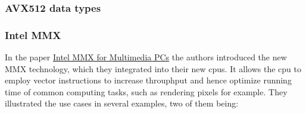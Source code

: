\documentclass[../../main.tex]{subfiles}
\begin{document}
\newpage
\subsubsection{AVX512 data types}

\bigskip
\subsubsection{Intel MMX}
In the paper \href{https://dl.acm.org/doi/pdf/10.1145/242857.242865}{Intel MMX for Multimedia PCs} the authors introduced the new MMX technology, which they integrated into their new cpus. It allows the cpu to employ vector instructions to increase throuphput and hence optimize running time of common computing tasks, such as rendering pixels for example. They illustrated the use cases in several examples, two of them being:
\end{document}
